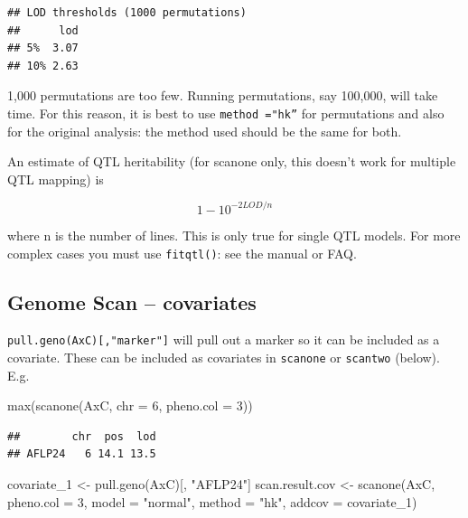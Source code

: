 \documentclass[
]{book}
\newenvironment{Shaded}{\begin{snugshade}}{\end{snugshade}}
\newcommand{\AttributeTok}[1]{\textcolor[rgb]{0.77,0.63,0.00}{#1}}
\newcommand{\DecValTok}[1]{\textcolor[rgb]{0.00,0.00,0.81}{#1}}
\newcommand{\FunctionTok}[1]{\textcolor[rgb]{0.00,0.00,0.00}{#1}}
\newcommand{\NormalTok}[1]{#1}
\newcommand{\OtherTok}[1]{\textcolor[rgb]{0.56,0.35,0.01}{#1}}
\newcommand{\StringTok}[1]{\textcolor[rgb]{0.31,0.60,0.02}{#1}}
\begin{document}
\begin{verbatim}
## LOD thresholds (1000 permutations)
##      lod
## 5%  3.07
## 10% 2.63
\end{verbatim}

1,000 permutations are too few. Running permutations, say 100,000, will take time. For this reason, it is best to use \texttt{method\ ="hk”} for permutations and also for the original analysis: the method used should be the same for both.

An estimate of QTL heritability (for scanone only, this doesn't work for multiple QTL mapping) is

\[1-10 ^{-2LOD/n}\]

where n is the number of lines. This is only true for single QTL models. For more complex cases you must use \texttt{fitqtl()}: see the manual or FAQ.

\hypertarget{genome-scan-covariates}{%
\subsection{Genome Scan -- covariates}\label{genome-scan-covariates}}

\texttt{pull.geno(AxC){[},"marker"{]}} will pull out a marker so it can be included as a covariate. These can be included as covariates in \texttt{scanone} or \texttt{scantwo} (below). E.g.

\begin{Shaded}
\begin{Highlighting}[]
\FunctionTok{max}\NormalTok{(}\FunctionTok{scanone}\NormalTok{(AxC, }\AttributeTok{chr =} \DecValTok{6}\NormalTok{, }\AttributeTok{pheno.col =} \DecValTok{3}\NormalTok{))}
\end{Highlighting}
\end{Shaded}

\begin{verbatim}
##        chr  pos  lod
## AFLP24   6 14.1 13.5
\end{verbatim}

\begin{Shaded}
\begin{Highlighting}[]
\NormalTok{covariate\_1 }\OtherTok{\textless{}{-}} \FunctionTok{pull.geno}\NormalTok{(AxC)[, }\StringTok{"AFLP24"}\NormalTok{]}
\NormalTok{scan.result.cov }\OtherTok{\textless{}{-}} \FunctionTok{scanone}\NormalTok{(AxC, }\AttributeTok{pheno.col =} \DecValTok{3}\NormalTok{, }\AttributeTok{model =} \StringTok{"normal"}\NormalTok{, }
    \AttributeTok{method =} \StringTok{"hk"}\NormalTok{, }\AttributeTok{addcov =}\NormalTok{ covariate\_1)}
\end{Highlighting}
\end{Shaded}
\end{document}
